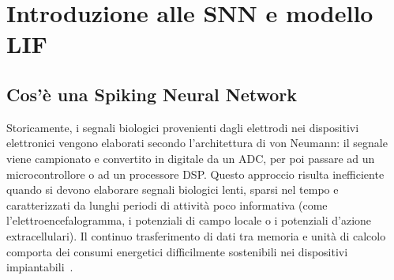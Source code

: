 \section[Introduzione alle SNN e modello LIF]{Introduzione alle SNN e modello LIF}
\label{sec:introduzione}

\subsection{Cos'è una Spiking Neural Network}
\label{subsec:paradigma}


Storicamente, i segnali biologici provenienti dagli elettrodi nei dispositivi elettronici vengono elaborati secondo l'architettura di von Neumann: il segnale viene campionato e convertito in digitale da un ADC, per poi passare ad un microcontrollore o ad un processore DSP. Questo approccio risulta inefficiente quando si devono elaborare segnali biologici lenti, sparsi nel tempo e caratterizzati da lunghi periodi di attività poco informativa (come l'elettroencefalogramma, i potenziali di campo locale o i potenziali d'azione extracellulari). Il continuo trasferimento di dati tra memoria e unità di calcolo comporta dei consumi energetici difficilmente sostenibili nei dispositivi impiantabili~\cite{qiao2015, moradi2018, bartels2025}.


